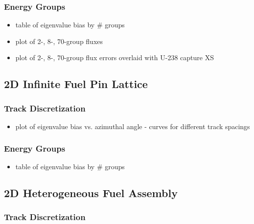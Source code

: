 \subsubsection{Energy Groups}
\label{subsubsec:chap4-pin-energy}

\begin{itemize}
  \item table of eigenvalue bias by \# groups
  \item plot of 2-, 8-, 70-group fluxes
  \item plot of 2-, 8-, 70-group flux errors overlaid with U-238 capture XS
\end{itemize}

\subsection{2D Infinite Fuel Pin Lattice}
\label{subsec:chap4-inf-lattice}

\subsubsection{Track Discretization}
\label{subsubsec:chap4-inf-lattice-tracks}

\begin{itemize}
  \item plot of eigenvalue bias vs. azimuthal angle - curves for different track spacings
\end{itemize}

\subsubsection{Energy Groups}
\label{subsubsec:chap4-pin-energy}

\begin{itemize}
  \item table of eigenvalue bias by \# groups
\end{itemize}

\subsection{2D Heterogeneous Fuel Assembly}

\subsubsection{Track Discretization}
\label{subsubsec:chap4-hetero-lattice-tracks}

